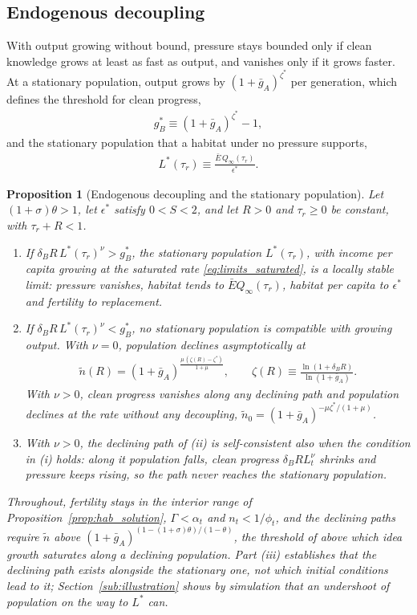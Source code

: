 \documentclass[11pt]{article}
\newtheorem{proposition}{Proposition}
\begin{document}
\subsection{Endogenous decoupling}
\label{sub:decoupling}
With output growing without bound, pressure stays bounded only if clean knowledge grows at least as fast
as output, and vanishes only if it grows faster. At a stationary population, output grows by $(1+\bar g_A)^{\zeta^\ast}$ per generation, which
defines the threshold for clean progress,
\begin{align}
g_B^\ast\equiv(1+\bar g_A)^{\zeta^\ast}-1,
\label{eq:gB_star}
\end{align}
and the stationary population that a habitat under no pressure supports,
\begin{align}
L^\ast(\tau_r)\equiv\frac{\bar E\,Q_\infty(\tau_r)}{\epsilon^\ast}.
\label{eq:L_star}
\end{align}

\begin{proposition}[Endogenous decoupling and the stationary population]
\label{prop:threshold}
\label{prop:decoupling}
Let $(1+\sigma)\theta>1$, let $\epsilon^\ast$ satisfy $0<S<2$, and let $R>0$ and $\tau_r\ge0$ be constant, with $\tau_r+R<1$.
\begin{enumerate}
\item[(i)] If $\delta_BR\,L^\ast(\tau_r)^{\nu}>g_B^\ast$, the stationary population $L^\ast(\tau_r)$, with
income per capita growing at the saturated rate \eqref{eq:limits_saturated}, is a locally stable limit:
pressure vanishes, habitat tends to $\bar EQ_\infty(\tau_r)$, habitat per capita to $\epsilon^\ast$ and
fertility to replacement.
\item[(ii)] If $\delta_BR\,L^\ast(\tau_r)^{\nu}<g_B^\ast$, no stationary population is compatible with
growing output. With $\nu=0$, population declines asymptotically at
\begin{align}
\tilde n(R)=(1+\bar g_A)^{\frac{\mu\,(\zeta(R)-\zeta^\ast)}{1+\mu}},
\qquad
\zeta(R)\equiv\frac{\ln(1+\delta_BR)}{\ln(1+\bar g_A)}.
\label{eq:n_tilde}
\end{align}
With $\nu>0$, clean progress vanishes along any declining path and population declines at the rate
without any decoupling, $\tilde n_0=(1+\bar g_A)^{-\mu\zeta^\ast/(1+\mu)}$.
\item[(iii)] With $\nu>0$, the declining path of (ii) is self-consistent also when the condition in (i)
holds: along it population falls, clean progress $\delta_BRL_t^{\nu}$ shrinks and pressure keeps rising,
so the path never reaches the stationary population.
\end{enumerate}
Throughout, fertility stays in the interior range of Proposition~\ref{prop:hab_solution},
$\Gamma<\alpha_t$ and $n_t<1/\phi_t$, and the declining paths require $\tilde n$ above
$(1+\bar g_A)^{(1-(1+\sigma)\theta)/(1-\theta)}$, the threshold of
\citet[Proposition~3]{STRULIK2024104943} above which idea growth saturates along a declining population.
Part (iii) establishes that the declining path exists alongside the stationary one, not which initial
conditions lead to it; Section~\ref{sub:illustration} shows by simulation that an undershoot of
population on the way to $L^\ast$ can.
\end{proposition}
\end{document}
